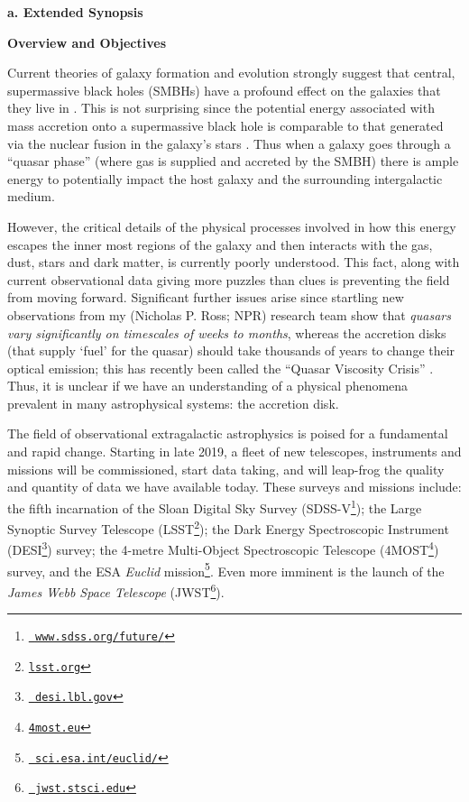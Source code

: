 \documentclass[oneside, a4paper, onecolumn, 11pt]{article}
\begin{document}
\vspace{-16pt}

\smallskip
\smallskip
\noindent
{\bf{\textcolor{Cerulean}{a. Extended Synopsis}}} 
\vspace{6pt}

\noindent
\large
{\bf{\textcolor{Cerulean}{Overview and Objectives}}}
\normalsize

\noindent
Current theories of galaxy formation and evolution strongly suggest
that central, supermassive black holes (SMBHs) have a profound effect
on the galaxies that they live in \citep[e.g., ][]{KormendyHo2013}.
This is not surprising since the potential energy associated with mass
accretion onto a supermassive black hole is comparable to that
generated via the nuclear fusion in the galaxy's stars \citep[see
e.g. ][]{Fabian2012}. Thus when a galaxy goes through a ``quasar
phase'' (where gas is supplied and accreted by the SMBH) there is
ample energy to potentially impact the host galaxy and the surrounding
intergalactic medium.

\smallskip
\smallskip
\noindent
However, the critical details of the physical processes involved in
how this energy escapes the inner most regions of the galaxy and then
interacts with the gas, dust, stars and dark matter, is currently
poorly understood. This fact, along with current observational data
giving more puzzles than clues is preventing the field from moving
forward. Significant further issues arise since startling new
observations from my (Nicholas P. Ross; NPR) research team
\citep{MacLeod2016, Ross2018} show that {\it quasars vary
significantly on timescales of weeks to months}, whereas the accretion
disks (that supply `fuel' for the quasar) should take thousands of
years to change their optical emission; this has recently been called
the ``Quasar Viscosity Crisis'' \citep[e.g., ][]{Lawrence2018}. Thus,
it is unclear if we have an understanding of a physical phenomena
prevalent in many astrophysical systems: the accretion disk.

\smallskip
\smallskip
\noindent
The field of observational extragalactic astrophysics is poised for a
fundamental and rapid change. Starting in late 2019, a fleet of new
telescopes, instruments and missions will be commissioned, start data
taking, and will leap-frog the quality and quantity of data we have
available today. These surveys and missions include: the fifth
incarnation of the Sloan Digital Sky Survey
(SDSS-V\footnote{\href{www.sdss.org/future/}{{\tt
www.sdss.org/future/}}}); the Large Synoptic Survey Telescope
(LSST\footnote{\href{lsst.org}{{\tt lsst.org}}}); the Dark Energy
Spectroscopic Instrument (DESI\footnote{\href{desi.lbl.gov}{{\tt
desi.lbl.gov}}}) survey; the 4-metre Multi-Object Spectroscopic
Telescope (4MOST\footnote{\href{4most.eu}{{\tt 4most.eu}}}) survey,
and the ESA {\it Euclid}
mission\footnote{\href{sci.esa.int/euclid/}{{\tt
sci.esa.int/euclid/}}}. Even more imminent is the launch of the {\it
James Webb Space Telescope} (JWST\footnote{\href{jwst.stsci.edu}{{\tt
jwst.stsci.edu}}}).
\end{document}
